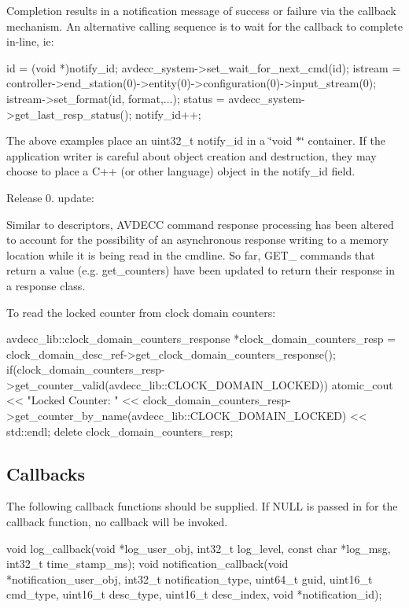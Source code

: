 Completion results in a notification message of success or failure via the callback mechanism. An alternative calling sequence is to wait for the callback to complete in-\/line, ie\+: \begin{DoxyVerb}id = (void *)notify_id;
avdecc_system->set_wait_for_next_cmd(id);
istream = controller->end_station(0)->entity(0)->configuration(0)->input_stream(0);
istream->set_format(id, format,...);
status = avdecc_system->get_last_resp_status();
notify_id++;
\end{DoxyVerb}


The above examples place an uint32\+\_\+t notify\+\_\+id in a \char`\"{}void $\ast$\char`\"{} container. If the application writer is careful about object creation and destruction, they may choose to place a C++ (or other language) object in the notify\+\_\+id field.

Release 0. update\+:

Similar to descriptors, A\+V\+D\+E\+CC command response processing has been altered to account for the possibility of an asynchronous response writing to a memory location while it is being read in the cmdline. So far, G\+E\+T\+\_\+ commands that return a value (e.\+g. get\+\_\+counters) have been updated to return their response in a response class.

To read the locked counter from clock domain counters\+: \begin{DoxyVerb}avdecc_lib::clock_domain_counters_response *clock_domain_counters_resp = clock_domain_desc_ref->get_clock_domain_counters_response();
if(clock_domain_counters_resp->get_counter_valid(avdecc_lib::CLOCK_DOMAIN_LOCKED))
    atomic_cout << "Locked Counter: " << clock_domain_counters_resp->get_counter_by_name(avdecc_lib::CLOCK_DOMAIN_LOCKED) << std::endl;
delete clock_domain_counters_resp;
\end{DoxyVerb}


\subsection*{Callbacks }

The following callback functions should be supplied. If N\+U\+LL is passed in for the callback function, no callback will be invoked. \begin{DoxyVerb}void log_callback(void *log_user_obj, int32_t log_level, const char *log_msg, int32_t time_stamp_ms);
void notification_callback(void *notification_user_obj, int32_t notification_type, uint64_t guid, uint16_t cmd_type, uint16_t desc_type, uint16_t desc_index, void *notification_id);
\end{DoxyVerb}


